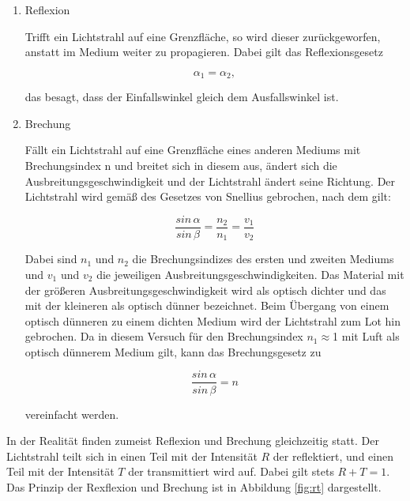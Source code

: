 \begin{enumerate}
\item Reflexion

Trifft ein Lichtstrahl auf eine Grenzfläche, so wird dieser zurückgeworfen, anstatt im Medium weiter zu propagieren.
Dabei gilt das Reflexionsgesetz

\begin{equation}
\alpha_1 = \alpha_2,
\label{eqn:refl}
\end{equation}

das besagt, dass der Einfallswinkel gleich dem Ausfallswinkel ist.

\item Brechung

Fällt ein Lichtstrahl auf eine Grenzfläche eines anderen Mediums mit Brechungsindex n und breitet sich in diesem aus,
ändert sich die Ausbreitungsgeschwindigkeit und der Lichtstrahl ändert seine Richtung.
Der Lichtstrahl wird gemäß des Gesetzes von Snellius gebrochen, nach dem gilt:

\begin{equation}
\frac{sin \, \alpha}{sin \, \beta} = \frac{n_2}{n_1} = \frac{v_1}{v_2} 
\label{eqn:snel}
\end{equation}

Dabei sind $n_1$ und $n_2$ die Brechungsindizes des ersten und zweiten Mediums und $v_1$ und $v_2$ die jeweiligen Ausbreitungsgeschwindigkeiten.
Das Material mit der größeren Ausbreitungsgeschwindigkeit wird als optisch dichter und das mit der kleineren als optisch dünner bezeichnet.
Beim Übergang von einem optisch dünneren zu einem dichten Medium wird der Lichtstrahl zum Lot hin gebrochen.
Da in diesem Versuch für den Brechungsindex $n_1\approx$1 mit Luft als optisch dünnerem Medium gilt, 
kann das Brechungsgesetz zu

\begin{equation}
    \frac{sin \, \alpha}{sin \, \beta} = n
    \label{eqn:snell}
\end{equation}

vereinfacht werden.

\end{enumerate}

\noindent
In der Realität finden zumeist Reflexion und Brechung gleichzeitig statt.
Der Lichtstrahl teilt sich in einen Teil mit der Intensität $R$ der reflektiert, und einen Teil mit der Intensität $T$ der transmittiert wird auf.
Dabei gilt stets $R + T = 1$.
Das Prinzip der Rexflexion und Brechung ist in Abbildung \ref{fig:rt} dargestellt.

